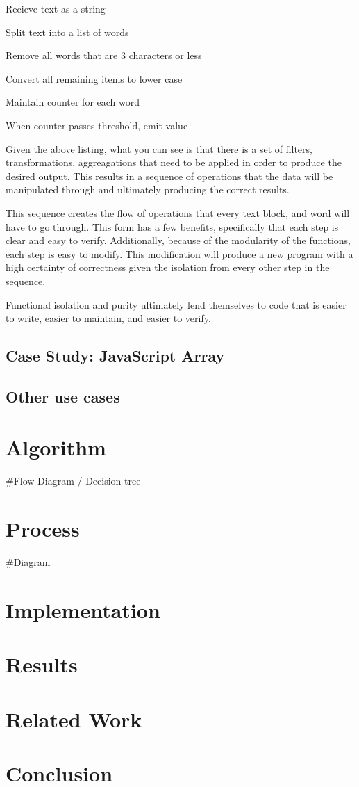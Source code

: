 \documentclass{article}
\begin{document}
\begin{enumerate*}
  \item Recieve text as a string
  \item Split text into a list of words
  \item Remove all words that are 3 characters or less
  \item Convert all remaining items to lower case
  \item Maintain counter for each word 
  \item When counter passes threshold, emit value
\end{enumerate*}

Given the above listing, what you can see is that there is a set of filters, transformations, aggreagations that need to be applied in order to produce the desired output.  This results in a sequence of operations that the data will be manipulated through and ultimately producing the correct results.  

This sequence creates the flow of operations that every text block, and word will have to go through.  This form has a few benefits, specifically that each step is clear and easy to verify.  Additionally, because of the modularity of the functions, each step is easy to modify.  This modification will produce a new program with a high certainty of correctness given the isolation from every other step in the sequence.  

Functional isolation and purity ultimately lend themselves to code that is easier to write, easier to maintain, and easier to verify.  

\subsection{Case Study: JavaScript Array}

\subsection{Other use cases}

\section{Algorithm}

#Flow Diagram / Decision tree

\section{Process}

#Diagram

\section{Implementation}

\section{Results}

\section{Related Work}

\section{Conclusion}
\end{document}
